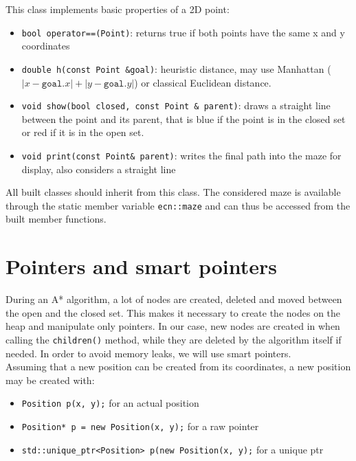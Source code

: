 \documentclass{ecnreport}
\begin{document}
This class implements basic properties of a 2D point:

\begin{itemize}
 \item \texttt{bool operator==(Point)}: returns true if both points have the same x and y coordinates
 \item \texttt{double h(const Point \&goal)}: heuristic distance, may use Manhattan
 ($|x-\texttt{goal}.x| + |y-\texttt{goal}.y|$) or classical Euclidean distance.
 \item \texttt{void show(bool closed, const Point \& parent)}: draws a straight line between the point and its parent, that
 is blue if the point is in the closed set or red if it is in the open set.
 \item \texttt{void print(const Point\& parent)}: writes the final path into the maze for display, also considers a straight line
\end{itemize}
All built classes should inherit from this class. The considered maze is available through the static member variable \texttt{ecn::maze} and can thus
be accessed from the built member functions.

\section{Pointers and smart pointers}\label{smart}

During an A* algorithm, a lot of nodes are created, deleted and moved between the open and the closed set.
This makes it necessary to create the nodes on the heap and manipulate only pointers. 
In our case, new nodes are created in when calling the \texttt{children()} method, while they are deleted by the algorithm
itself if needed. In order to avoid memory leaks, we will use smart pointers.\\

Assuming that a new position can be created from its coordinates, a new position may be created with:
\begin{itemize}
\item \texttt{Position p(x, y);} for an actual position
 \item \texttt{Position* p = new Position(x, y);} for a raw pointer
 \item \texttt{std::unique\_ptr<Position> p(new Position(x, y);} for a unique ptr
\end{itemize}
\end{document}
